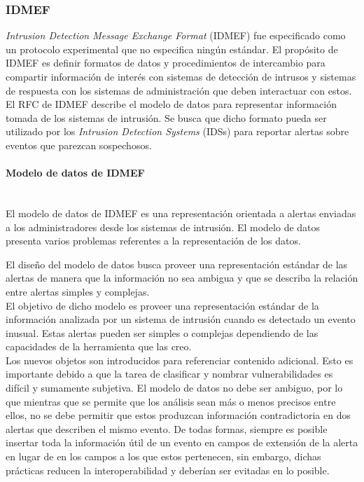 \subsubsection{IDMEF}

\textit{Intrusion Detection Message Exchange Format} (IDMEF) fue especificado como un 
protocolo experimental que no especifica ningún estándar. El propósito de 
IDMEF es definir formatos de datos y procedimientos de intercambio para 
compartir información de interés con sistemas de detección de intrusos y 
sistemas de respuesta con los sistemas de administración que deben 
interactuar con estos. El RFC de IDMEF describe el modelo de datos para 
representar información tomada de los sistemas de intrusión. Se busca que dicho 
formato pueda ser utilizado por los \textit{Intrusion Detection Systems} (IDSs) para 
reportar alertas sobre eventos que parezcan sospechosos.\\

\paragraph{Modelo de datos de IDMEF}\ \\
El modelo de datos de IDMEF es una representación orientada a alertas enviadas a 
los administradores desde los sistemas de intrusión. El modelo de datos presenta 
varios problemas referentes a la representación de los datos.

El diseño del modelo de datos busca proveer una representación estándar de las 
alertas de manera que la información no sea ambigua y que se describa la 
relación entre alertas simples y complejas.\\

El objetivo de dicho modelo es proveer una representación estándar de la 
información analizada por un sistema de intrusión cuando es detectado 
un evento inusual. Estas alertas pueden ser simples o complejas 
dependiendo de las capacidades de la herramienta que las creo.\\

Los nuevos objetos son introducidos para referenciar contenido adicional. Esto 
es importante debido a que la tarea de clasificar y nombrar vulnerabilidades es 
difícil y sumamente subjetiva. El modelo de datos no debe ser ambiguo, por lo 
que mientras que se permite que los análisis sean más o menos precisos 
entre ellos, no se debe permitir que estos produzcan información contradictoria  
en dos alertas que describen el mismo evento. De todas formas, siempre es 
posible insertar toda la información útil de un evento en campos de extensión 
de la alerta en lugar de en los campos a los que estos pertenecen, sin embargo, 
dichas prácticas reducen la interoperabilidad y deberían ser evitadas en lo 
posible.


